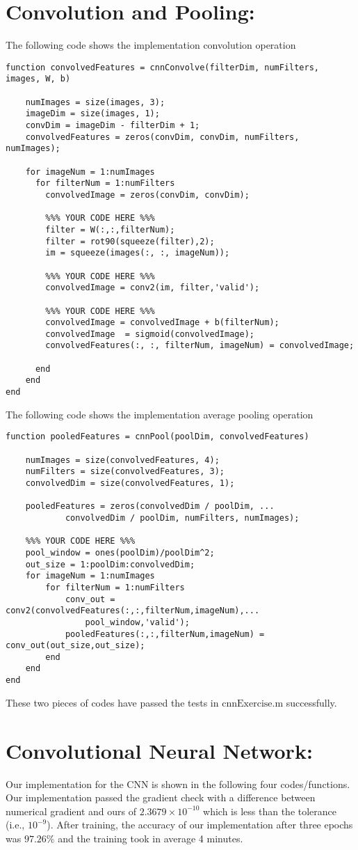 \documentclass[12pt] {article}
\begin{document}
\section*{Convolution and Pooling:} 
The following code shows the implementation convolution operation
\begin{lstlisting}
function convolvedFeatures = cnnConvolve(filterDim, numFilters, images, W, b)

	numImages = size(images, 3);
	imageDim = size(images, 1);
	convDim = imageDim - filterDim + 1;
	convolvedFeatures = zeros(convDim, convDim, numFilters, numImages);

	for imageNum = 1:numImages
	  for filterNum = 1:numFilters    	
	    convolvedImage = zeros(convDim, convDim);

    	%%% YOUR CODE HERE %%%
	    filter = W(:,:,filterNum);
	    filter = rot90(squeeze(filter),2);      
	    im = squeeze(images(:, :, imageNum));

    	%%% YOUR CODE HERE %%%
	    convolvedImage = conv2(im, filter,'valid');

	    %%% YOUR CODE HERE %%%
    	convolvedImage = convolvedImage + b(filterNum);
	    convolvedImage  = sigmoid(convolvedImage);    
    	convolvedFeatures(:, :, filterNum, imageNum) = convolvedImage;
    	
	  end	
	end
end
\end{lstlisting}
\newpage
The following code shows the implementation average pooling operation
\begin{lstlisting}
function pooledFeatures = cnnPool(poolDim, convolvedFeatures)

	numImages = size(convolvedFeatures, 4);
	numFilters = size(convolvedFeatures, 3);
	convolvedDim = size(convolvedFeatures, 1);

	pooledFeatures = zeros(convolvedDim / poolDim, ...
    	    convolvedDim / poolDim, numFilters, numImages);

	%%% YOUR CODE HERE %%%
	pool_window = ones(poolDim)/poolDim^2;
	out_size = 1:poolDim:convolvedDim;
	for imageNum = 1:numImages
    	for filterNum = 1:numFilters
			conv_out = conv2(convolvedFeatures(:,:,filterNum,imageNum),...
                pool_window,'valid');
	        pooledFeatures(:,:,filterNum,imageNum) = conv_out(out_size,out_size);
	    end
	end
end
\end{lstlisting}

These two pieces of codes have passed the tests in $\mathrm{cnnExercise.m}$ successfully.
\newpage
\section*{Convolutional Neural Network:} 
Our implementation for the CNN is shown in the following four codes/functions. Our implementation passed the gradient check with a difference between numerical gradient and ours of $ 2.3679 \times 10^{-10}$ which is less than the tolerance (i.e., $ 10^{-9}$). After training, the accuracy of our implementation after three epochs was $97.26\%$ and the training took in average 4 minutes. 
\end{document}
